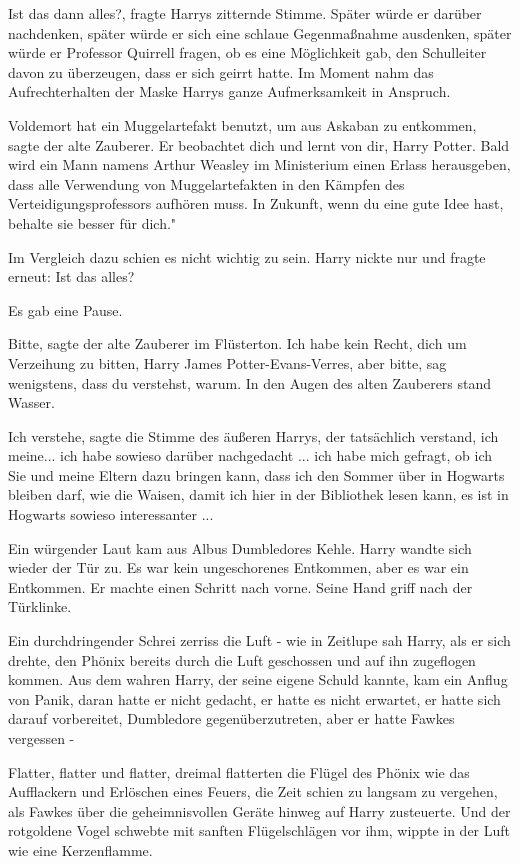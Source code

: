 \glqq{}Ist das dann alles?\grqq{}, fragte Harrys zitternde Stimme. Später würde
er darüber nachdenken, später würde er sich eine schlaue Gegenmaßnahme
ausdenken, später würde er Professor Quirrell fragen, ob es eine Möglichkeit
gab, den Schulleiter davon zu überzeugen, dass er sich geirrt hatte. Im Moment
nahm das Aufrechterhalten der Maske Harrys ganze Aufmerksamkeit in Anspruch.

\glqq{}Voldemort hat ein Muggelartefakt benutzt, um aus Askaban zu
entkommen\grqq{}, sagte der alte Zauberer. \glqq{}Er beobachtet dich und lernt
von dir, Harry Potter. Bald wird ein Mann namens Arthur Weasley im Ministerium
einen Erlass herausgeben, dass alle Verwendung von Muggelartefakten in den
Kämpfen des Verteidigungsprofessors aufhören muss. In Zukunft, wenn du eine gute
Idee hast, behalte sie besser für dich."

Im Vergleich dazu schien es nicht wichtig zu sein. Harry nickte nur und fragte
erneut: \glqq{}Ist das alles?\grqq{}

Es gab eine Pause.

\glqq{}Bitte\grqq{}, sagte der alte Zauberer im Flüsterton. \glqq{}Ich habe kein
Recht, dich um Verzeihung zu bitten, Harry James Potter-Evans-Verres, aber
bitte, sag wenigstens, dass du verstehst, warum.\grqq{} In den Augen des alten
Zauberers stand Wasser.

\glqq{}Ich verstehe\grqq{}, sagte die Stimme des äußeren Harrys, der tatsächlich
verstand, \glqq{}ich meine... ich habe sowieso darüber nachgedacht ... ich habe
mich gefragt, ob ich Sie und meine Eltern dazu bringen kann, dass ich den Sommer
über in Hogwarts bleiben darf, wie die Waisen, damit ich hier in der Bibliothek
lesen kann, es ist in Hogwarts sowieso interessanter ...\grqq{}

Ein würgender Laut kam aus Albus Dumbledores Kehle. Harry wandte sich wieder der
Tür zu. Es war kein ungeschorenes Entkommen, aber es war ein Entkommen. Er
machte einen Schritt nach vorne. Seine Hand griff nach der Türklinke.

Ein durchdringender Schrei zerriss die Luft - wie in Zeitlupe sah Harry, als er
sich drehte, den Phönix bereits durch die Luft geschossen und auf ihn zugeflogen
kommen. Aus dem wahren Harry, der seine eigene Schuld kannte, kam ein Anflug von
Panik, daran hatte er nicht gedacht, er hatte es nicht erwartet, er hatte sich
darauf vorbereitet, Dumbledore gegenüberzutreten, aber er hatte Fawkes vergessen
-

Flatter, flatter und flatter, dreimal flatterten die Flügel des Phönix wie das
Aufflackern und Erlöschen eines Feuers, die Zeit schien zu langsam zu vergehen,
als Fawkes über die geheimnisvollen Geräte hinweg auf Harry zusteuerte. Und der
rotgoldene Vogel schwebte mit sanften Flügelschlägen vor ihm, wippte in der Luft
wie eine Kerzenflamme.

